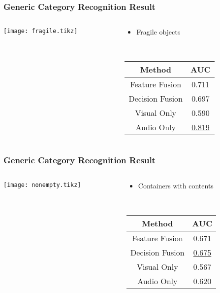 \documentclass{beamer}
\begin{document}
  \begin{frame}
    \frametitle{Generic Category Recognition Result}

    \begin{columns}
      \begin{column}{.6\textwidth}
        \centering
        \footnotesize
        \texttt{[image: fragile.tikz]}
      \end{column}
      \begin{column}{.4\textwidth}
        \begin{itemize}
          \item Fragile objects
        \end{itemize}
        ~

        \footnotesize
        \begin{tabular}[h]{c|c}
          \hline
          Method & AUC \\ \hline \hline
          Feature Fusion & 0.711 \\ \hline
          Decision Fusion  & 0.697 \\ \hline
          Visual Only & 0.590 \\ \hline
          Audio Only & \underline{0.819} \\ \hline
        \end{tabular}
      \end{column}
    \end{columns}
  \end{frame}
  \begin{frame}
    \frametitle{Generic Category Recognition Result}

    \begin{columns}
      \begin{column}{.6\textwidth}
        \centering
        \footnotesize
        \texttt{[image: nonempty.tikz]}
      \end{column}
      \begin{column}{.4\textwidth}
        \begin{itemize}
          \item Containers with contents
        \end{itemize}
        ~

        \footnotesize
        \begin{tabular}[h]{c|c}
          \hline
          Method & AUC \\ \hline \hline
          Feature Fusion & 0.671 \\ \hline
          Decision Fusion  & \underline{0.675} \\ \hline
          Visual Only & 0.567 \\ \hline
          Audio Only & 0.620 \\ \hline
        \end{tabular}
      \end{column}
    \end{columns}
  \end{frame}
\end{document}
